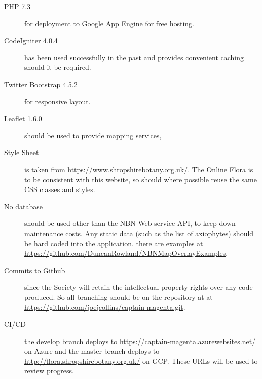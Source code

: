 \documentclass[a4paper,12pt,landscape]{article}
\begin{document}
\begin{description}
    \item[PHP 7.3] for deployment to Google App Engine for free hosting.
    \item[CodeIgniter 4.0.4] has been used successfully in the past and provides convenient caching should it be required.
    \item[Twitter Bootstrap 4.5.2] for responsive layout.
    \item[Leaflet 1.6.0] should be used to provide mapping services,
    \item[Style Sheet] is taken from \url{https://www.shropshirebotany.org.uk/}.
      The Online Flora is to be consistent with this website,
      so should where possible reuse the same CSS classes and styles.
    \item[No database] should be used other than the NBN Web service API,
      to keep down maintenance costs.
      Any static data 
      (such as the list of axiophytes)
      should be hard coded into the application.
      there are examples at \url{https://github.com/DuncanRowland/NBNMapOverlayExamples}.
    \item[Commits to Github] since the Society will retain the intellectual property rights
      over any code produced.
      So all branching should be on the repository at
      at \url{https://github.com/joejcollins/captain-magenta.git}.
    \item[CI/CD] the develop branch deploys to \url{https://captain-magenta.azurewebsites.net/} on Azure
      and the master branch deploys to \url{http://flora.shropshirebotany.org.uk/} on GCP.
      These URLs will be used to review progress.
\end{description}
\end{document}
